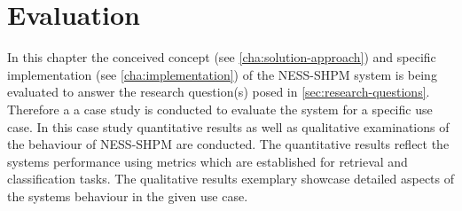 \documentclass[11pt]{scrreprt}
\begin{document}
%
%




\chapter{Evaluation}
In this chapter the conceived concept (see \cref{cha:solution-approach}) and specific implementation (see \cref{cha:implementation}) of the NESS-SHPM system is being evaluated to answer the research question(s) posed in \cref{sec:research-questions}. Therefore a a case study is conducted to evaluate the system for a specific use case. In this case study quantitative results as well as qualitative examinations of the behaviour of NESS-SHPM are conducted. The quantitative results reflect the systems performance using metrics which are established for retrieval and classification tasks. The qualitative results exemplary showcase detailed aspects of the systems behaviour in the given use case.
\end{document}
